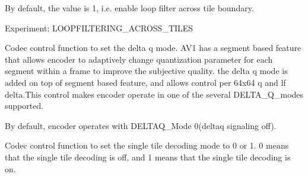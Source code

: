 \begin{Desc}
\begin{description}
By default, the value is 1, i.\+e. enable loop filter across tile boundary.

Experiment\+: L\+O\+O\+P\+F\+I\+L\+T\+E\+R\+I\+N\+G\+\_\+\+A\+C\+R\+O\+S\+S\+\_\+\+T\+I\+L\+ES \item[{\em 
A\+V1\+E\+\_\+\+S\+E\+T\+\_\+\+D\+E\+L\+T\+A\+Q\+\_\+\+M\+O\+DE\hypertarget{group__aom__encoder_ggae78dde67a6d78f332e9bdba0dde42db5ad26eda6211bf3d5fe4f5999ec52b264b}{}\label{group__aom__encoder_ggae78dde67a6d78f332e9bdba0dde42db5ad26eda6211bf3d5fe4f5999ec52b264b}
}]Codec control function to set the delta q mode. A\+V1 has a segment based feature that allows encoder to adaptively change quantization parameter for each segment within a frame to improve the subjective quality. the delta q mode is added on top of segment based feature, and allows control per 64x64 q and lf delta.\+This control makes encoder operate in one of the several D\+E\+L\+T\+A\+\_\+\+Q\+\_\+modes supported.

By default, encoder operates with D\+E\+L\+T\+A\+Q\+\_\+\+Mode 0(deltaq signaling off). \item[{\em 
A\+V1\+E\+\_\+\+S\+E\+T\+\_\+\+S\+I\+N\+G\+L\+E\+\_\+\+T\+I\+L\+E\+\_\+\+D\+E\+C\+O\+D\+I\+NG\hypertarget{group__aom__encoder_ggae78dde67a6d78f332e9bdba0dde42db5af341538631ffe2ac2b562c8b5336a10a}{}\label{group__aom__encoder_ggae78dde67a6d78f332e9bdba0dde42db5af341538631ffe2ac2b562c8b5336a10a}
}]Codec control function to set the single tile decoding mode to 0 or 1. 0 means that the single tile decoding is off, and 1 means that the single tile decoding is on.


\end{description}
\end{Desc}
